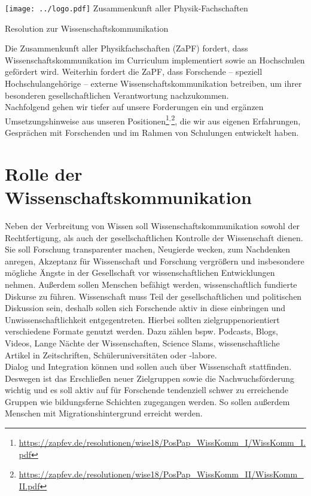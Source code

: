 \documentclass[DIV=calc]{scrartcl}
\begin{document}
    \hspace{0.87\textwidth}
    \begin{minipage}{120pt}
        \vspace{-1.8cm}
        \texttt{[image: ../logo.pdf]}
        \centering
        \small Zusammenkunft aller Physik-Fachschaften
    \end{minipage}
    \begin{center}
        \huge{Resolution zur Wissenschaftskommunikation}\vspace{.25\baselineskip}\\
        \normalsize
    \end{center}
    \vspace{1cm}

Die Zusammenkunft aller Physikfachschaften (ZaPF) fordert, dass Wissenschaftskommunikation im Curriculum implementiert sowie an Hochschulen ge\-för\-dert wird. Weiterhin fordert die ZaPF, dass Forschende – speziell Hochschulangehörige – externe Wissenschaftskommunikation betreiben, um ihrer besonderen gesellschaftlichen Verantwortung nachzukommen.\\
Nachfolgend gehen wir tiefer auf unsere Forderungen ein und ergänzen Umsetzungshinweise aus unseren Positionen\footnote{\url{https://zapfev.de/resolutionen/wise18/PosPap\_WissKomm\_I/WissKomm\_I.pdf}}$^,$\footnote{\url{https://zapfev.de/resolutionen/wise18/PosPap\_WissKomm\_II/WissKomm\_II.pdf}}, die wir aus eigenen Erfahrungen, Gesprächen mit Forschenden und im Rahmen von Schulungen entwickelt haben.

\section{Rolle der Wissenschaftskommunikation}

Neben der Verbreitung von Wissen soll Wissenschaftskommunikation sowohl der Rechtfertigung, als auch der gesellschaftlichen Kontrolle der Wissenschaft dienen. Sie soll Forschung transparenter machen, Neugierde wecken, zum Nachdenken anregen, Akzeptanz für Wissenschaft und Forschung vergrößern und insbesondere mögliche Ängste in der Gesellschaft vor wissenschaftlichen Entwicklungen nehmen. Außerdem sollen Menschen befähigt werden, wissenschaftlich fundierte Diskurse zu führen. Wissenschaft muss Teil der gesellschaftlichen und politischen Diskussion sein, deshalb sollen sich Forschende aktiv in diese einbringen und Unwissenschaftlichkeit entgegentreten. Hierbei sollten zielgruppenorientiert verschiedene Formate genutzt werden. Dazu zählen bspw. Podcasts, Blogs, Videos, Lange Nächte der Wissenschaften, Science Slams, wissenschaftliche Artikel in Zeitschriften, Schüleruniversitäten oder -labore.\\
Dialog und Integration können und sollen auch über Wissenschaft stattfinden. Deswegen ist das Erschließen neuer Zielgruppen sowie die Nachwuchsförderung wichtig und es soll aktiv auf für Forschende tendenziell schwer zu erreichende Gruppen wie bildungsferne Schichten zugegangen werden. So sollen außerdem Menschen mit Migrationshintergrund erreicht werden.
\end{document}
